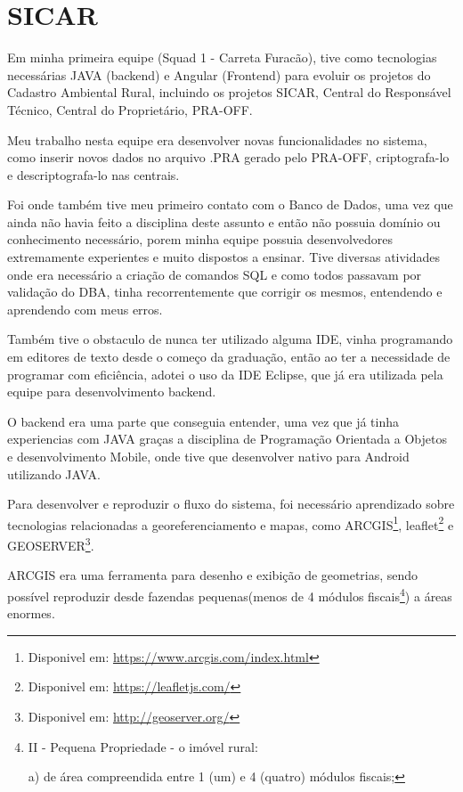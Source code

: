 \section{SICAR}

Em minha primeira equipe (Squad 1 - Carreta Furacão), tive como tecnologias necessárias JAVA (backend) e Angular (Frontend) para evoluir os projetos do Cadastro Ambiental Rural, incluindo os projetos SICAR, Central do Responsável Técnico, Central do Proprietário, PRA-OFF.

Meu trabalho nesta equipe era desenvolver novas funcionalidades no sistema, como inserir novos dados no arquivo .PRA gerado pelo PRA-OFF, criptografa-lo e descriptografa-lo nas centrais.

Foi onde também tive meu primeiro contato com o Banco de Dados, uma vez que ainda não havia feito a disciplina deste assunto e então não possuia domínio ou conhecimento necessário, porem minha equipe possuia desenvolvedores extremamente experientes e muito dispostos a ensinar.
Tive diversas atividades onde era necessário a criação de comandos SQL e como todos passavam por validação do DBA, tinha recorrentemente que corrigir os mesmos, entendendo e aprendendo com meus erros.

Também tive o obstaculo de nunca ter utilizado alguma IDE, vinha programando em editores de texto desde o começo da graduação, então ao ter a necessidade de programar com eficiência, adotei o uso da IDE Eclipse, que já era utilizada pela equipe para desenvolvimento backend.

O backend era uma parte que conseguia entender, uma vez que já tinha experiencias com JAVA graças a disciplina de Programação Orientada a Objetos e desenvolvimento Mobile, onde tive que desenvolver nativo para Android utilizando JAVA.

Para desenvolver e reproduzir o fluxo do sistema, foi necessário aprendizado sobre tecnologias relacionadas a georeferenciamento e mapas, como ARCGIS\footnote{Disponivel em: \url{https://www.arcgis.com/index.html}}, leaflet\footnote{Disponivel em: \url{https://leafletjs.com/}} e GEOSERVER\footnote{Disponivel em: \url{http://geoserver.org/}}.

ARCGIS era uma ferramenta para desenho e exibição de geometrias, sendo possível reproduzir desde fazendas pequenas(menos de 4 módulos fiscais\footnote{II - Pequena Propriedade - o imóvel rural:

a) de área compreendida entre 1 (um) e 4 (quatro) módulos fiscais;\cite{brasil1993}}) a áreas enormes.

